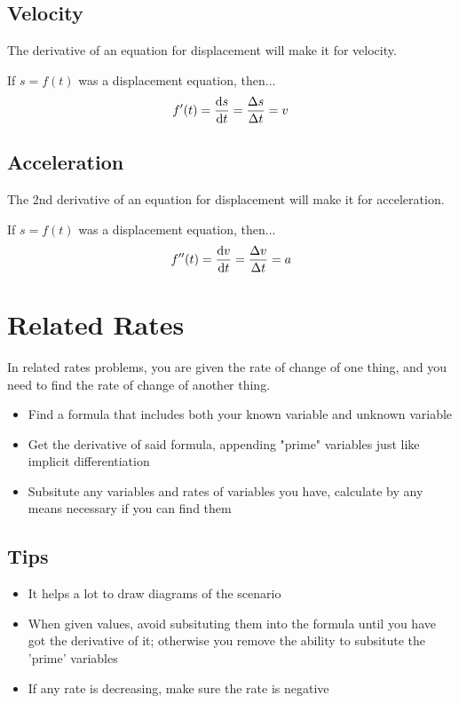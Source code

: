 \documentclass[a4paper,12pt]{article}
\begin{document}
\subsection{Velocity}
The derivative of an equation for displacement will make it for velocity.

If $s = f(t)$ was a displacement equation, then...
$$f'(t) = \dv{s}{t} = \frac{\Delta{s}}{\Delta{t}} = v$$

\subsection{Acceleration}
The 2nd derivative of an equation for displacement will make it for acceleration.

If $s = f(t)$ was a displacement equation, then...
$$f''(t) = \dv{v}{t} = \frac{\Delta{v}}{\Delta{t}} = a$$

\pagebreak

\section{Related Rates}
In related rates problems, you are given the rate of change of one thing, and you need to find the rate of change of another thing.

\begin{itemize}
    \item{Find a formula that includes both your known variable and unknown variable}
    \item{Get the derivative of said formula, appending "prime" variables just like implicit differentiation}
    \item{Subsitute any variables and rates of variables you have, calculate by any means necessary if you can find them}
\end{itemize}

\subsection{Tips}
\begin{itemize}
    \item{It helps a lot to draw diagrams of the scenario}
    \item{When given values, avoid subsituting them into the formula until you have got the derivative of it; otherwise you remove the ability to subsitute the 'prime' variables}
    \item{If any rate is decreasing, make sure the rate is negative}
\end{itemize}
\end{document}
